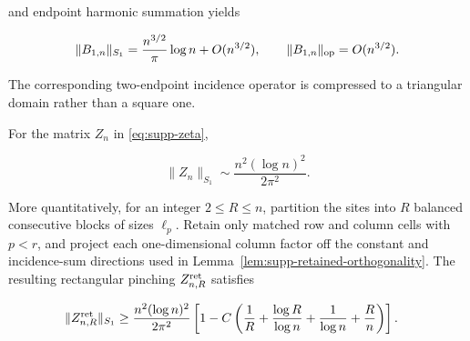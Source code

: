 and endpoint harmonic summation yields

\begin{equation}\label{eq:supp-b1-trace-law}
 \|B_{1,n}\|_{S_1}
 =\frac{n^{3/2}}\pi\log n+O(n^{3/2}),
 \qquad \|B_{1,n}\|_{\rm op}=O(n^{3/2}).
\end{equation}

The corresponding two-endpoint incidence operator is compressed to a
triangular domain rather than a square one.

\begin{proposition}
\label{prop:supp-b2-trace}
For the matrix \(Z_n\) in \eqref{eq:supp-zeta},

\begin{equation}\label{eq:supp-b2-trace-law}
 \|Z_n\|_{S_1}
 \sim\frac{n^2(\log n)^2}{2\pi^2}.
\end{equation}

More quantitatively, for an integer \(2\le R\le n\), partition the sites into
\(R\) balanced consecutive blocks of sizes \(\ell_p\). Retain only matched row
and column cells with
\(p<r\), and project each one-dimensional column factor off the constant and
incidence-sum directions used in
Lemma~\ref{lem:supp-retained-orthogonality}. The resulting rectangular
pinching \(Z_{n,R}^{\rm ret}\) satisfies

\begin{align}
 \|Z_{n,R}^{\rm ret}\|_{S_1}
 &\ge\frac{n^2(\log n)^2}{2\pi^2}
 \left[1-C\left(
 \frac1R+\frac{\log R}{\log n}
 +\frac1{\log n}+\frac Rn\right)\right].
 \label{eq:supp-b2-retained-rate}
\end{align}
\end{proposition}


